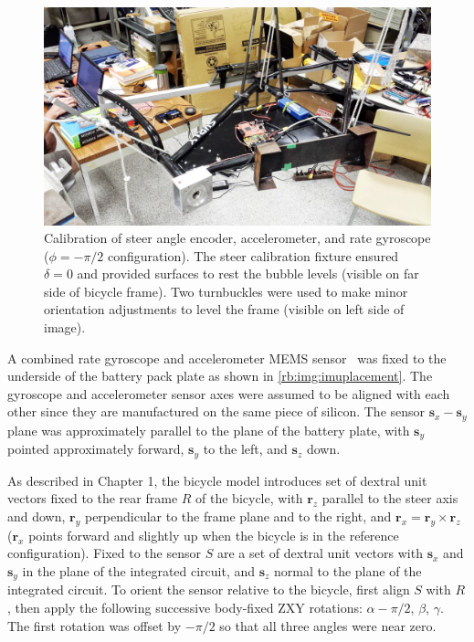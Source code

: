 \begin{figure}[htbp]
  \centering
  \includegraphics[width=\textwidth]{images/20130711_163732_2.jpg}
  \caption[Calibration of steer angle encoder, accelerometer, and rate
    gyroscope.]{Calibration of steer angle encoder, accelerometer, and rate
    gyroscope ($\phi=-\pi/2$ configuration). The steer calibration fixture
    ensured $\delta=0$ and provided surfaces to rest the bubble levels (visible
    on far side of bicycle frame). Two turnbuckles were used to make minor
    orientation adjustments to level the frame (visible on left side of image).}
  \label{rb:img:calibration}
\end{figure}

A combined rate gyroscope and accelerometer MEMS
sensor~\cite{InvensenseMPU6050} was fixed to the underside of the battery pack
plate as shown in \autoref{rb:img:imuplacement}. The gyroscope and
accelerometer sensor axes were assumed to be aligned with each other since they
are manufactured on the same piece of silicon. The sensor $\bm{s}_x-\bm{s}_y$
plane was approximately parallel to the plane of the battery plate, with
$\bm{s}_y$ pointed approximately forward, $\bm{s}_y$ to the left, and
$\bm{s}_z$ down.

As described in Chapter 1, the bicycle model introduces set of dextral unit
vectors fixed to the rear frame $R$ of the bicycle, with $\bm{r}_z$ parallel to
the steer axis and down, $\bm{r}_y$ perpendicular to the frame plane and to the
right, and $\bm{r}_x = \bm{r}_y \times \bm{r}_z$ ($\bm{r}_x$ points forward and
slightly up when the bicycle is in the reference configuration). Fixed to the sensor $S$
are a set of dextral unit vectors with $\bm{s}_x$ and $\bm{s}_y$ in the plane
of the integrated circuit, and $\bm{s}_z$ normal to the plane of the integrated
circuit. To orient the sensor relative to the bicycle, first align $S$ with
$R$, then apply the following successive body-fixed ZXY rotations: $\alpha -
\pi/2$, $\beta$, $\gamma$. The first rotation was offset by $-\pi/2$ so that
all three angles were near zero.

